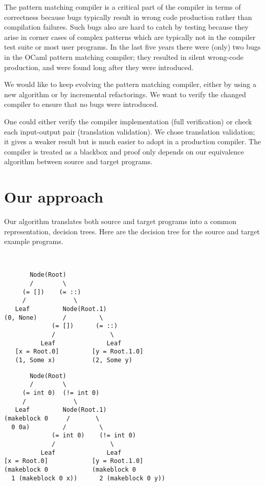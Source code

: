 \documentclass[12pt]{article}
\begin{document}
The pattern matching compiler is a critical part of the compiler
in terms of correctness because bugs typically result in wrong code
production rather than compilation failures.
Such bugs also are hard to catch by testing because they arise in
corner cases of complex patterns which are typically not in the
compiler test suite or most user programs.
In the last five years there were (only) two bugs in the OCaml pattern
matching compiler; they resulted in silent wrong-code production,
and were found long after they were introduced.

We would like to keep evolving the pattern matching compiler, either by
using a new algorithm or by incremental refactorings.
We want to verify the changed compiler to ensure that no bugs were
introduced.

One could either verify the compiler implementation
(full verification) or check each input-output pair
(translation validation). We chose translation validation; it gives
a weaker result but is much easier to adopt in a production
compiler. The compiler is treated as a blackbox and proof only depends
on our equivalence algorithm between source and target programs.

\section{Our approach}


Our algorithm translates both source and target programs into a common
representation, decision trees. Here are the decision tree for the
source and target example programs.

~

\begin{minipage}{0.4\linewidth}
\begin{verbatim}
       Node(Root)
       /        \
     (= [])    (= ::)
     /             \
   Leaf         Node(Root.1)
(0, None)       /         \
             (= [])      (= ::)
             /               \
          Leaf              Leaf
   [x = Root.0]         [y = Root.1.0]
   (1, Some x)          (2, Some y)
\end{verbatim}
\end{minipage}
\hfill
\begin{minipage}{0.5\linewidth}
\begin{verbatim}
       Node(Root)
       /        \
     (= int 0)  (!= int 0)
     /             \
   Leaf         Node(Root.1)
(makeblock 0     /       \
  0 0a)         /         \
             (= int 0)    (!= int 0)
             /               \
          Leaf              Leaf
[x = Root.0]            [y = Root.1.0]
(makeblock 0            (makeblock 0
  1 (makeblock 0 x))      2 (makeblock 0 y))
\end{verbatim}
\end{minipage}
\end{document}
